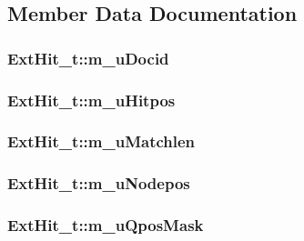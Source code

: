 \subsection{Member Data Documentation}
\hypertarget{structExtHit__t_aeeb4c8b597e1e30fd21071cdf705f2e0}{
\subsubsection[{m\-\_\-u\-Docid}]{ Ext\-Hit\-\_\-t\-::m\-\_\-u\-Docid}}\label{structExtHit__t_aeeb4c8b597e1e30fd21071cdf705f2e0}
\hypertarget{structExtHit__t_a41d3b564c98eb634ba5e9023c0377d6e}{
\subsubsection[{m\-\_\-u\-Hitpos}]{ Ext\-Hit\-\_\-t\-::m\-\_\-u\-Hitpos}}\label{structExtHit__t_a41d3b564c98eb634ba5e9023c0377d6e}
\hypertarget{structExtHit__t_ac47022c7c08d0bee709e7a4974753f95}{
\subsubsection[{m\-\_\-u\-Matchlen}]{ Ext\-Hit\-\_\-t\-::m\-\_\-u\-Matchlen}}\label{structExtHit__t_ac47022c7c08d0bee709e7a4974753f95}
\hypertarget{structExtHit__t_a2fbd01527bb12881c9f8e1125a8e1047}{
\subsubsection[{m\-\_\-u\-Nodepos}]{ Ext\-Hit\-\_\-t\-::m\-\_\-u\-Nodepos}}\label{structExtHit__t_a2fbd01527bb12881c9f8e1125a8e1047}
\hypertarget{structExtHit__t_a44641c915e72ca70cf70d46c99f576ed}{
\subsubsection[{m\-\_\-u\-Qpos\-Mask}]{ Ext\-Hit\-\_\-t\-::m\-\_\-u\-Qpos\-Mask}}\label{structExtHit__t_a44641c915e72ca70cf70d46c99f576ed}
